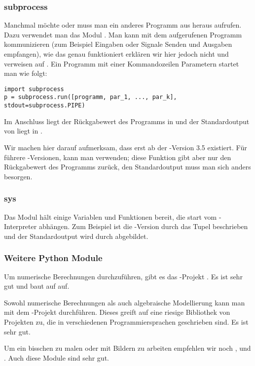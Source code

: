 \subsubsection{subprocess}
\label{section:module:empfohlene_module:subprocess}
Manchmal möchte oder muss man ein anderes Programm aus \Python heraus aufrufen.
Dazu verwendet man das Modul .
Man kann mit dem aufgerufenen Programm kommunizieren (zum Beispiel Eingaben oder Signale Senden und Ausgaben empfangen),
wie das genau funktioniert erklären wir hier jedoch nicht und verweisen auf \cite[Library, Concurrent Execution, Subprocess management]{Python3}.
Ein Programm  mit einer Kommandozeilen Parametern  startet man wie folgt:
\begin{lstlisting}
import subprocess
p = subprocess.run([programm, par_1, ..., par_k], stdout=subprocess.PIPE)
\end{lstlisting}
Im Anschluss liegt der Rückgabewert des Programms  in  und der Standardoutput von  liegt in .

Wir machen hier darauf aufmerksam, dass  erst ab der \Python-Version 3.5 existiert.
Für führere \Python-Versionen, kann man  verwenden; diese Funktion gibt aber nur den Rückgabewert des Programms zurück, den Standardoutput muss man sich anders besorgen.


\subsubsection{sys}
\label{section:module:empfohlene_module:sys}
Das Modul  hält einige Variablen und Funktionen bereit, die start vom \Python-Interpreter abhängen.
Zum Beispiel ist die \Python-Version durch das Tupel  beschrieben und der Standardoutput wird durch  abgebildet.


\subsubsection{Weitere Python Module}
\label{section:module:empfohlene_module:rest}
Um numerische Berechnungen durchzuführen, gibt es das \Python-Projekt .
Es ist sehr gut und baut auf  auf.

Sowohl numerische Berechnungen als auch algebraische Modellierung kann man mit dem \Python-Projekt  durchführen.
Dieses greift auf eine riesige Bibliothek von Projekten zu, die in verschiedenen Programmiersprachen geschrieben sind.
Es ist sehr gut.

Um ein bisschen zu malen oder mit Bildern zu arbeiten empfehlen wir noch ,  und .
Auch diese Module sind sehr gut.